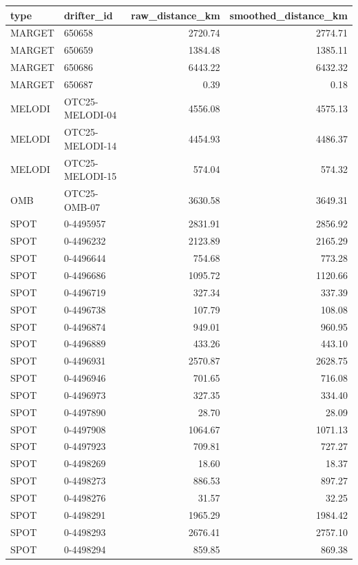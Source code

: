 \begin{tabular}{llrr}
\toprule
type & drifter_id & raw_distance_km & smoothed_distance_km \\
\midrule
MARGET & 650658 & 2720.74 & 2774.71 \\
MARGET & 650659 & 1384.48 & 1385.11 \\
MARGET & 650686 & 6443.22 & 6432.32 \\
MARGET & 650687 & 0.39 & 0.18 \\
MELODI & OTC25-MELODI-04 & 4556.08 & 4575.13 \\
MELODI & OTC25-MELODI-14 & 4454.93 & 4486.37 \\
MELODI & OTC25-MELODI-15 & 574.04 & 574.32 \\
OMB & OTC25-OMB-07 & 3630.58 & 3649.31 \\
SPOT & 0-4495957 & 2831.91 & 2856.92 \\
SPOT & 0-4496232 & 2123.89 & 2165.29 \\
SPOT & 0-4496644 & 754.68 & 773.28 \\
SPOT & 0-4496686 & 1095.72 & 1120.66 \\
SPOT & 0-4496719 & 327.34 & 337.39 \\
SPOT & 0-4496738 & 107.79 & 108.08 \\
SPOT & 0-4496874 & 949.01 & 960.95 \\
SPOT & 0-4496889 & 433.26 & 443.10 \\
SPOT & 0-4496931 & 2570.87 & 2628.75 \\
SPOT & 0-4496946 & 701.65 & 716.08 \\
SPOT & 0-4496973 & 327.35 & 334.40 \\
SPOT & 0-4497890 & 28.70 & 28.09 \\
SPOT & 0-4497908 & 1064.67 & 1071.13 \\
SPOT & 0-4497923 & 709.81 & 727.27 \\
SPOT & 0-4498269 & 18.60 & 18.37 \\
SPOT & 0-4498273 & 886.53 & 897.27 \\
SPOT & 0-4498276 & 31.57 & 32.25 \\
SPOT & 0-4498291 & 1965.29 & 1984.42 \\
SPOT & 0-4498293 & 2676.41 & 2757.10 \\
SPOT & 0-4498294 & 859.85 & 869.38 \\
\bottomrule
\end{tabular}

